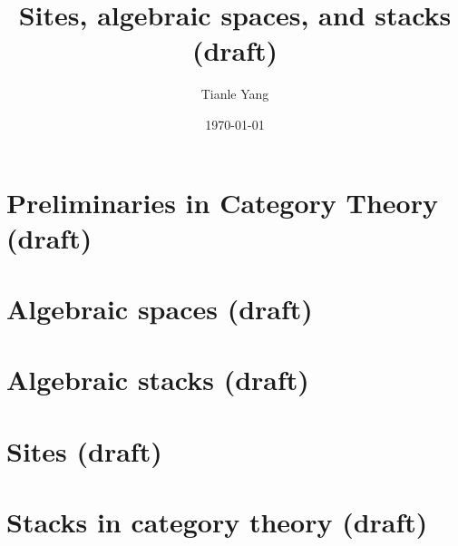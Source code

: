 \documentclass[sectionlevel=chapter]{noteformyself}
\title{Sites, algebraic spaces, and stacks (draft)}
\author{Tianle Yang}
\date{\today}
\begin{document}
    \maketitle

    \tableofcontents

    \section{Preliminaries in Category Theory (draft)}
    
    \section{Algebraic spaces (draft)}
    
    \section{Algebraic stacks (draft)}
    
    \section{Sites (draft)}
    
    \section{Stacks in category theory (draft)}
    

    \printbibliography[heading=bibintoc, title={References}]
    
\end{document}

